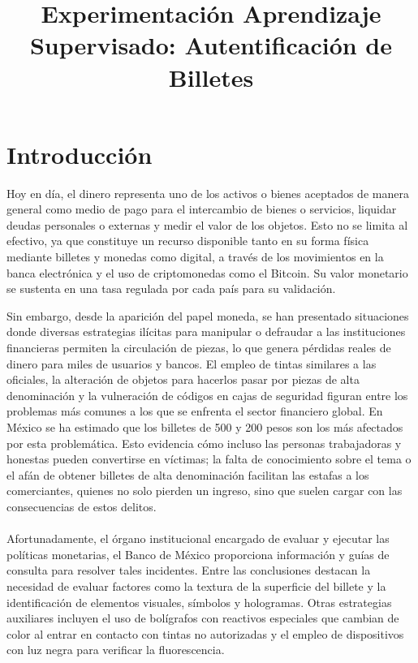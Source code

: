 \documentclass[conference]{IEEEtran}
\title{Experimentación Aprendizaje Supervisado: Autentificación de Billetes }
\author{
	\IEEEauthorblockN{Leonardo Daniel Aviña Neri}
	\IEEEauthorblockA{
		\texttt{ld.avinaneri@ugto.mx}
	}
	\and
	\IEEEauthorblockN{Diana Laura Garcia Zavala}
	\IEEEauthorblockA{
		\texttt{dl.garcia.zavala@ugto.mx}
	}
	\and
	\IEEEauthorblockN{Jonathan Omar Villafaña Razo}
	\IEEEauthorblockA{
		\texttt{jo.villafanarazo@ugto.mx}
	}
	\and
	\IEEEauthorblockN{Alejandro Reynoso Flores}
	\IEEEauthorblockA{
		\texttt{a.reynosoflores@ugto.mx}
	}
	\and
	\IEEEauthorblockN{Ademar Antonio De Leon Vazquez}
	\IEEEauthorblockA{
	\texttt{aa.deleonvazquez@ugto.mx
	}
	}
	\and
	\IEEEauthorblockN{Emmanuel Vargas Cisneros}
	\IEEEauthorblockA{
		\texttt{e.vargascisneros@ugto.mx}
	}
}
\begin{document}
	\maketitle
	
	\begin{abstract}
	\end{abstract}
	
	\begin{IEEEkeywords}
		
	\end{IEEEkeywords}
	
	\section{Introducción}
	Hoy en día, el dinero representa uno de los activos o bienes aceptados de manera general como medio de pago para el intercambio de bienes o servicios, liquidar deudas personales o externas y medir el valor de los objetos. Esto no se limita al efectivo, ya que constituye un recurso disponible tanto en su forma física mediante billetes y monedas como digital, a través de los movimientos en la banca electrónica y el uso de criptomonedas como el Bitcoin. Su valor monetario se sustenta en una tasa regulada por cada país para su validación. 
	
	Sin embargo, desde la aparición del papel moneda, se han presentado situaciones donde diversas estrategias ilícitas para manipular o defraudar a las instituciones financieras permiten la circulación de piezas, lo que genera pérdidas reales de dinero para miles de usuarios y bancos. El empleo de tintas similares a las oficiales, la alteración de objetos para hacerlos pasar por piezas de alta denominación y la vulneración de códigos en cajas de seguridad figuran entre los problemas más comunes a los que se enfrenta el sector financiero global.
	En México se ha estimado que los billetes de 500 y 200 pesos son los más afectados por esta problemática. Esto evidencia cómo incluso las personas trabajadoras y honestas pueden convertirse en víctimas; la falta de conocimiento sobre el tema o el afán de obtener billetes de alta denominación facilitan las estafas a los comerciantes, quienes no solo pierden un ingreso, sino que suelen cargar con las consecuencias de estos delitos.
	\\\\
	Afortunadamente, el órgano institucional encargado de evaluar y ejecutar las políticas monetarias, el Banco de México proporciona información y guías de consulta para resolver tales incidentes. Entre las conclusiones destacan la necesidad de evaluar factores como la textura de la superficie del billete y la identificación de elementos visuales, símbolos y hologramas. Otras estrategias auxiliares incluyen el uso de bolígrafos con reactivos especiales que cambian de color al entrar en contacto con tintas no autorizadas y el empleo de dispositivos con luz negra para verificar la fluorescencia.
	
\end{document}
